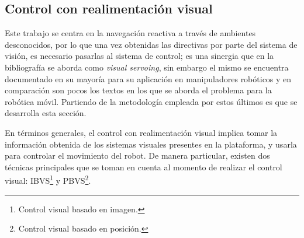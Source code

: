 \subsection{Control con realimentación visual}
Este trabajo se centra en la navegación reactiva a través de ambientes desconocidos, por lo que una vez obtenidas las directivas por parte del sistema de visión, es necesario pasarlas al sistema de control; es una sinergia que en la bibliografía se aborda como {\it visual servoing}, sin embargo el mismo se encuentra documentado en su mayoría para su aplicación en manipuladores robóticos y en comparación son pocos los textos en los que se aborda el problema para la robótica móvil. Partiendo de la metodología empleada por estos últimos es que se desarrolla esta sección.
\par En términos generales, el control con realimentación visual implica tomar la información obtenida de los sistemas visuales presentes en la plataforma, y usarla para controlar el movimiento del robot. De manera particular, existen dos técnicas principales que se toman en cuenta al momento de realizar el control visual: IBVS\footnote{Control visual basado en imagen.} y PBVS\footnote{Control visual basado en posición.}. 
